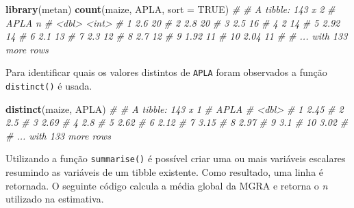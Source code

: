\documentclass[
]{book}
\newenvironment{Shaded}{\begin{snugshade}}{\end{snugshade}}
\newcommand{\CommentTok}[1]{\textcolor[rgb]{0.56,0.35,0.01}{\textit{#1}}}
\newcommand{\DataTypeTok}[1]{\textcolor[rgb]{0.13,0.29,0.53}{#1}}
\newcommand{\KeywordTok}[1]{\textcolor[rgb]{0.13,0.29,0.53}{\textbf{#1}}}
\newcommand{\NormalTok}[1]{#1}
\newcommand{\OperatorTok}[1]{\textcolor[rgb]{0.81,0.36,0.00}{\textbf{#1}}}
\newcommand{\OtherTok}[1]{\textcolor[rgb]{0.56,0.35,0.01}{#1}}
\newcommand{\StringTok}[1]{\textcolor[rgb]{0.31,0.60,0.02}{#1}}
\begin{document}
\begin{Shaded}
\begin{Highlighting}[]
\KeywordTok{library}\NormalTok{(metan)}
\KeywordTok{count}\NormalTok{(maize, APLA, }\DataTypeTok{sort =} \OtherTok{TRUE}\NormalTok{)}
\CommentTok{# # A tibble: 143 x 2}
\CommentTok{#     APLA     n}
\CommentTok{#    <dbl> <int>}
\CommentTok{#  1  2.6     20}
\CommentTok{#  2  2.8     20}
\CommentTok{#  3  2.5     16}
\CommentTok{#  4  2       14}
\CommentTok{#  5  2.92    14}
\CommentTok{#  6  2.1     13}
\CommentTok{#  7  2.3     12}
\CommentTok{#  8  2.7     12}
\CommentTok{#  9  1.92    11}
\CommentTok{# 10  2.04    11}
\CommentTok{# # ... with 133 more rows}
\end{Highlighting}
\end{Shaded}

Para identificar quais os valores distintos de \texttt{APLA} foram observados a função \texttt{distinct()} é usada.

\begin{Shaded}
\begin{Highlighting}[]
\KeywordTok{distinct}\NormalTok{(maize, APLA)}
\CommentTok{# # A tibble: 143 x 1}
\CommentTok{#     APLA}
\CommentTok{#    <dbl>}
\CommentTok{#  1  2.45}
\CommentTok{#  2  2.5 }
\CommentTok{#  3  2.69}
\CommentTok{#  4  2.8 }
\CommentTok{#  5  2.62}
\CommentTok{#  6  2.12}
\CommentTok{#  7  3.15}
\CommentTok{#  8  2.97}
\CommentTok{#  9  3.1 }
\CommentTok{# 10  3.02}
\CommentTok{# # ... with 133 more rows}
\end{Highlighting}
\end{Shaded}

Utilizando a função \texttt{summarise()} é possível criar uma ou mais variáveis escalares resumindo as variáveis de um tibble existente. Como resultado, uma linha é retornada. O seguinte código calcula a média global da MGRA e retorna o \emph{n} utilizado na estimativa.

\begin{Shaded}
\end{Shaded}
\end{document}
